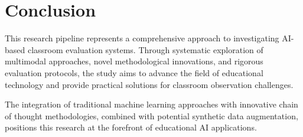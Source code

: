 \documentclass[12pt]{article}
\begin{document}
\section{Conclusion}

This research pipeline represents a comprehensive approach to investigating AI-based classroom evaluation systems. Through systematic exploration of multimodal approaches, novel methodological innovations, and rigorous evaluation protocols, the study aims to advance the field of educational technology and provide practical solutions for classroom observation challenges.

The integration of traditional machine learning approaches with innovative chain of thought methodologies, combined with potential synthetic data augmentation, positions this research at the forefront of educational AI applications.
\end{document}

